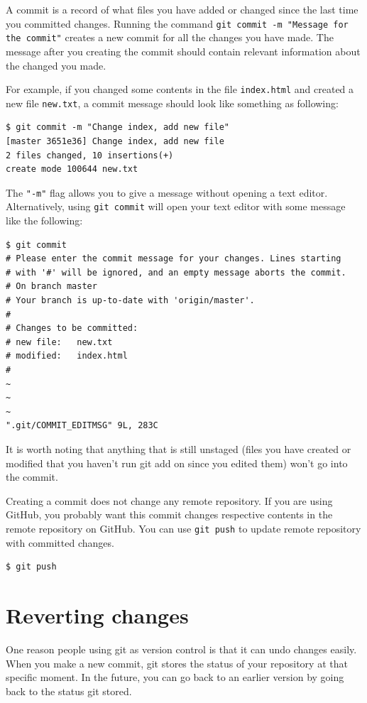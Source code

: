 \documentclass[12pt]{report}
\renewcommand\section[1]{{\chapter{#1}}}
\begin{document}
A commit is a record of what files you have added or changed since the last time you committed changes. Running the command \texttt{git commit -m "Message for the commit"} creates a new commit for all the changes you have made. The message after you creating the commit should contain relevant information about the changed you made.

For example, if you changed some contents in the file \texttt{index.html} and created a new file \texttt{new.txt}, a commit message should look like something as following:

\begin{verbatim}
$ git commit -m "Change index, add new file"
[master 3651e36] Change index, add new file
2 files changed, 10 insertions(+)
create mode 100644 new.txt
\end{verbatim}

The \texttt{"-m"} flag allows you to give a message without opening a text editor. Alternatively, using \texttt{git commit} will open your text editor with some message like the following:

\begin{verbatim}
$ git commit
# Please enter the commit message for your changes. Lines starting
# with '#' will be ignored, and an empty message aborts the commit.
# On branch master
# Your branch is up-to-date with 'origin/master'.
#
# Changes to be committed:
# new file:   new.txt
# modified:   index.html
#
~
~
~
".git/COMMIT_EDITMSG" 9L, 283C
\end{verbatim}


It is worth noting that anything that is still unstaged (files you have created or modified that you haven’t run git add on since you edited them) won’t go into the commit. 

Creating a commit does not change any remote repository. If you are using GitHub, you probably want this commit changes respective contents in the remote repository on GitHub. You can use \texttt{git push} to update remote repository with committed changes.

\begin{verbatim}
$ git push
\end{verbatim}

\section{Reverting changes}

One reason people using git as version control is that it can undo changes easily. When you make a new commit, git stores the status of your repository at that specific moment. In the future, you can go back to an earlier version by going back to the status git stored.
\end{document}
